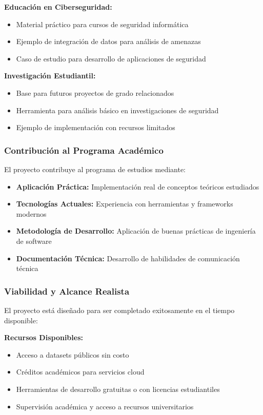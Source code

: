 \textbf{Educación en Ciberseguridad:}
\begin{itemize}
    \item Material práctico para cursos de seguridad informática
    \item Ejemplo de integración de datos para análisis de amenazas
    \item Caso de estudio para desarrollo de aplicaciones de seguridad
\end{itemize}

\textbf{Investigación Estudiantil:}
\begin{itemize}
    \item Base para futuros proyectos de grado relacionados
    \item Herramienta para análisis básico en investigaciones de seguridad
    \item Ejemplo de implementación con recursos limitados
\end{itemize}

\subsubsection{Contribución al Programa Académico}
El proyecto contribuye al programa de estudios mediante:

\begin{itemize}
    \item \textbf{Aplicación Práctica:} Implementación real de conceptos teóricos estudiados
    \item \textbf{Tecnologías Actuales:} Experiencia con herramientas y frameworks modernos
    \item \textbf{Metodología de Desarrollo:} Aplicación de buenas prácticas de ingeniería de software
    \item \textbf{Documentación Técnica:} Desarrollo de habilidades de comunicación técnica
\end{itemize}

\subsubsection{Viabilidad y Alcance Realista}
El proyecto está diseñado para ser completado exitosamente en el tiempo disponible:

\textbf{Recursos Disponibles:}
\begin{itemize}
    \item Acceso a datasets públicos sin costo
    \item Créditos académicos para servicios cloud
    \item Herramientas de desarrollo gratuitas o con licencias estudiantiles
    \item Supervisión académica y acceso a recursos universitarios
\end{itemize}

